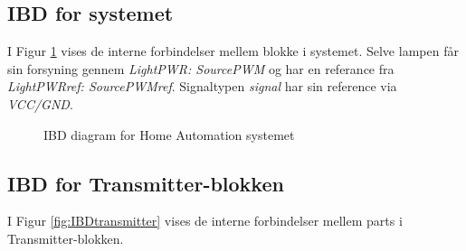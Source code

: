 \begin{landscape}

\subsection{IBD for systemet}

I Figur \ref{fig:IBDsystem} vises de interne forbindelser mellem blokke i systemet. Selve lampen får sin forsyning gennem \emph{LightPWR: SourcePWM} og har en referance fra \emph{LightPWRref: SourcePWMref}. Signaltypen \emph{signal} har sin reference via \emph{VCC/GND}.

\begin{figure}[h]
	\centering {}
	\caption{IBD diagram for Home Automation systemet}
	\label{fig:IBDsystem}
\end{figure}

\end{landscape}

\clearpage

\subsection{IBD for Transmitter-blokken}

I Figur \ref{fig:IBDtransmitter} vises de interne forbindelser mellem parts i Transmitter-blokken.

